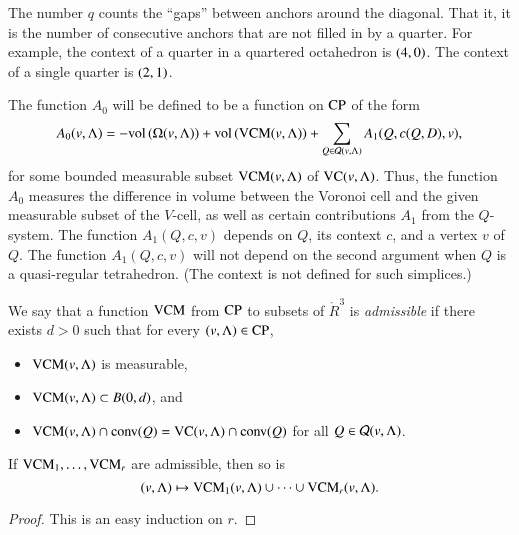 \begin{remark}
The number $q$ counts the ``gaps'' between anchors around the
diagonal. That it, it is the number of consecutive anchors that
are not filled in by a quarter.  For example, the context of a
quarter in a quartered octahedron is $\relax(4,0)$. The context of a
single quarter is $\relax(2,1)$.
\end{remark}

The function $A_0$ will be defined to be a function on ${\operatorname{CP}}$
of the form
  \begin{equation}
  A_0(v,\Lambda) = -{\operatorname{vol}}\,(\Omega(v,\Lambda)) + {\operatorname{vol}}\,({\operatorname{VCM}}(v,\Lambda)) +
   \sum_{Q\in{\mathcal Q}(v,\Lambda)} A_1(Q,c(Q,D),v),
   \label{eqn:A1}
   \end{equation}
for some bounded measurable subset ${\operatorname{VCM}}(v,\Lambda)$ of ${\operatorname{VC}}(v,\Lambda)$.
Thus, the function $A_0$ measures the difference in volume between
the Voronoi cell and the given measurable subset of the $V$-cell,
as well as certain contributions $A_1$ from the $Q$-system. The
function $A_1(Q,c,v)$ depends on $Q$, its context $c$, and a
vertex $v$ of $Q$.  The function $A_1(Q,c,v)$ will not depend on
the second argument when $Q$ is a quasi-regular tetrahedron.  (The
context is not defined for such simplices.)

\begin{definition}\label{def:vcm-admiss}  We say that a function ${\operatorname{VCM}}$ from
${\operatorname{CP}}$ to subsets of $\ring{R}^3$ is {\it admissible} if
 there exists $d>0$ such that for every
$(v,\Lambda)\in{\operatorname{CP}}$,
    \begin{itemize}
        \item ${\operatorname{VCM}}(v,\Lambda)$ is measurable,
        \item ${\operatorname{VCM}}(v,\Lambda)\subset B(0,d)$, and
        \item ${\operatorname{VCM}}(v,\Lambda)\cap {\operatorname{conv}}(Q) = 
         {\operatorname{VC}}(v,\Lambda)\cap {\operatorname{conv}}(Q)$ for all
        $Q\in{\mathcal Q}(v,\Lambda)$.
    \end{itemize}
\end{definition}

\begin{lemma} If ${\operatorname{VCM}}_1,\ldots,{\operatorname{VCM}}_r$ are admissible,
then so is $$(v,\Lambda)\mapsto {\operatorname{VCM}}_1(v,\Lambda)\cup\cdots\cup {\operatorname{VCM}}_r(v,\Lambda).$$
\end{lemma}

\begin{proof} This is an easy induction on $r$.
\end{proof}

